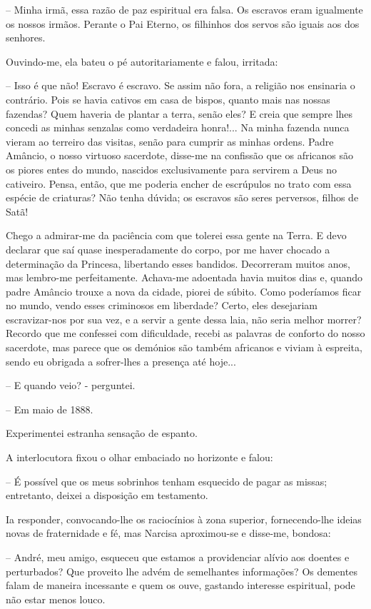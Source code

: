 \documentclass[portuguese,12pt,a4paper]{scrbook}
\begin{document}
	– Minha irmã, essa razão de paz espiritual era falsa. Os escravos eram igualmente os nossos irmãos. Perante o Pai Eterno, os filhinhos dos servos são iguais aos dos senhores.
	
	Ouvindo-me, ela bateu o pé autoritariamente e falou, irritada:
	
	– Isso é que não! Escravo é escravo. Se assim não fora, a religião nos ensinaria o contrário. Pois se havia cativos em casa de bispos, quanto mais nas nossas fazendas? Quem haveria de plantar a terra, senão eles? E creia que sempre lhes concedi as minhas senzalas como verdadeira honra!... Na minha fazenda nunca vieram ao terreiro das visitas, senão para cumprir as minhas ordens. Padre Amâncio, o nosso virtuoso sacerdote, disse-me na confissão que os africanos são os piores entes do mundo, nascidos exclusivamente para servirem a Deus no cativeiro. Pensa, então, que me poderia encher de escrúpulos no trato com essa espécie de criaturas? Não tenha dúvida; os escravos são seres perversos, filhos de Satã!
	
	Chego a admirar-me da paciência com que tolerei essa gente na Terra. E devo declarar que saí quase inesperadamente do corpo, por me haver chocado a determinação da Princesa, libertando esses bandidos. Decorreram muitos anos, mas lembro-me perfeitamente. Achava-me adoentada havia muitos dias e, quando padre Amâncio trouxe a nova da cidade, piorei de súbito. Como poderíamos ficar no mundo, vendo esses criminosos em liberdade? Certo, eles desejariam escravizar-nos por sua vez, e a servir a gente dessa laia, não seria melhor morrer? Recordo que me confessei com dificuldade, recebi as palavras de conforto do nosso sacerdote, mas parece que os demónios são também africanos e viviam à espreita, sendo eu obrigada a sofrer-lhes a presença até hoje...
	
	– E quando veio? - perguntei.
	
	– Em maio de 1888.
	
	
	Experimentei estranha sensação de espanto.
	
	A interlocutora fixou o olhar embaciado no horizonte e falou:
	
	– É possível que os meus sobrinhos tenham esquecido de pagar as missas; entretanto, deixei a disposição em testamento.
	
	Ia responder, convocando-lhe os raciocínios à zona superior, fornecendo-lhe ideias novas de fraternidade e fé, mas Narcisa aproximou-se e disse-me, bondosa:
	
	– André, meu amigo, esqueceu que estamos a providenciar alívio aos doentes e perturbados? Que proveito lhe advém de semelhantes informações? Os dementes falam de maneira incessante e quem os ouve, gastando interesse espiritual, pode não estar menos louco.
	
\end{document}
